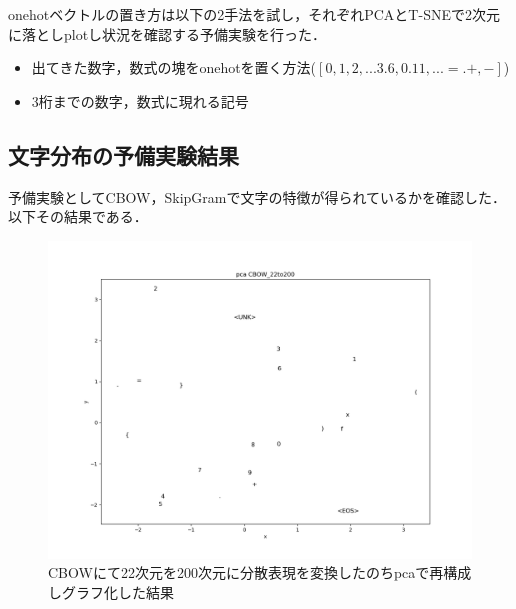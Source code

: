 \documentclass[a4j,11pt,report]{jsbook}
\begin{document}
onehotベクトルの置き方は以下の2手法を試し，それぞれPCAとT-SNEで2次元に落としplotし状況を確認する予備実験を行った．
\begin{itemize}
  \item 出てきた数字，数式の塊をonehotを置く方法($[0,1,2, ... 3.6,0.11,...=.+,-]$)
  \item 3桁までの数字，数式に現れる記号
\end{itemize}


\subsection{文字分布の予備実験結果}
予備実験としてCBOW，SkipGramで文字の特徴が得られているかを確認した．
以下その結果である．

\begin{center}
  \begin{figure}[H]
    \centering
    \includegraphics[width=\linewidth]{image/CBOW_pca_out22_200.png}
    \caption{CBOWにて22次元を200次元に分散表現を変換したのちpcaで再構成しグラフ化した結果}
    \label{fig:89x2cbow_pac}
  \end{figure}
\end{center}
\end{document}
